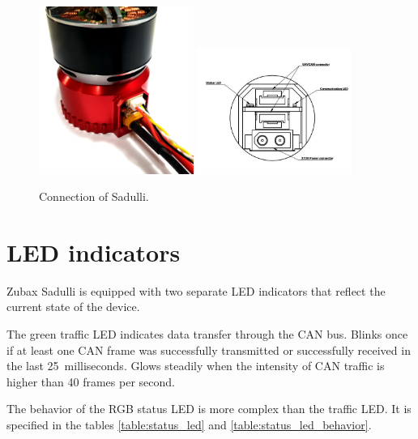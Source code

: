 \documentclass{zubaxdoc}
\begin{document}
\begin{figure}[hb]
    \includegraphics[width=0.45\textwidth]{sadulli-connectors} \includegraphics[width=0.45\textwidth]{connectors}
    \caption{Connection of Sadulli.\label{Sadulli_connectors}}
\end{figure}


\section{LED indicators}

\newcommand{\LEDX}{{\rule{0.4em}{1.0em}}}
\newcommand{\LEDO}{{\rule{0.4em}{0.1em}}}

\newcommand{\ShowColor}[1]{{\color{#1}\rule{2em}{0.8em}}}

Zubax Sadulli is equipped with two separate LED indicators that reflect the current state of the device.

The green traffic LED indicates data transfer through the CAN bus. Blinks once if at least one CAN frame 
was successfully transmitted or successfully received in the last 25~milliseconds. Glows steadily when 
the intensity of CAN traffic is higher than 40 frames per second.

The behavior of the RGB status LED is more complex than the traffic LED. 
It is specified in the tables \ref{table:status_led} and \ref{table:status_led_behavior}.
\end{document}
